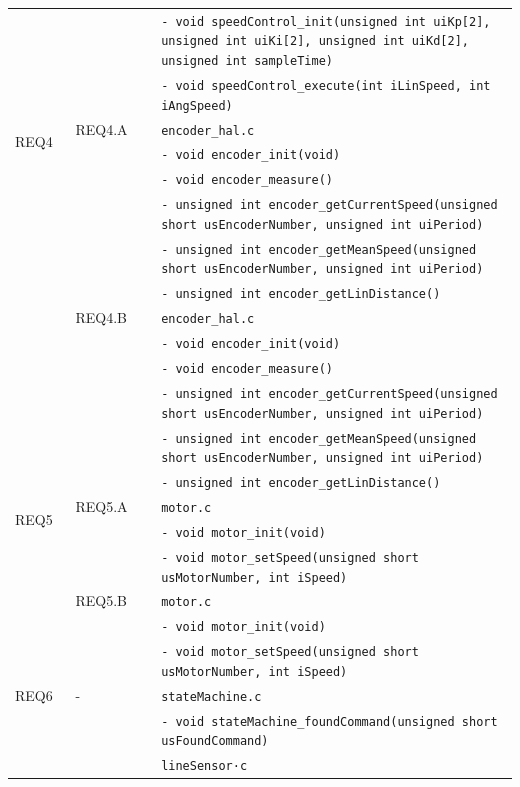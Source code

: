 \documentclass{article}
\begin{document}
\begin{longtable}{|p{0.125\linewidth}|p{0.17\linewidth}|p{0.75\linewidth}|}
        && \texttt{- void speedControl\_init(unsigned int uiKp[2], unsigned int uiKi[2], unsigned int uiKd[2], unsigned int sampleTime)}\\
        && \texttt{- void speedControl\_execute(int iLinSpeed, int iAngSpeed)}\\
        \hline
         \multirow{2}{*}{REQ4}
        & REQ4.A & \texttt{encoder\_hal.c}\\ 
        && \texttt{- void encoder\_init(void)}\\
        && \texttt{- void encoder\_measure()}\\
        && \texttt{- unsigned int encoder\_getCurrentSpeed(unsigned short usEncoderNumber, unsigned int uiPeriod)}\\
        && \texttt{- unsigned int encoder\_getMeanSpeed(unsigned short usEncoderNumber, unsigned int uiPeriod)}\\
        && \texttt{- unsigned int encoder\_getLinDistance()}\\
		\cline{2-3}
        & REQ4.B & \texttt{encoder\_hal.c}\\ 
        && \texttt{- void encoder\_init(void)}\\
        && \texttt{- void encoder\_measure()}\\
        && \texttt{- unsigned int encoder\_getCurrentSpeed(unsigned short usEncoderNumber, unsigned int uiPeriod)}\\
        && \texttt{- unsigned int encoder\_getMeanSpeed(unsigned short usEncoderNumber, unsigned int uiPeriod)}\\
        && \texttt{- unsigned int encoder\_getLinDistance()}\\
        \hline
         \multirow{2}{*}{REQ5}
        & REQ5.A & \texttt{motor.c}\\ 
        && \texttt{- void motor\_init(void)}\\
        && \texttt{- void motor\_setSpeed(unsigned short usMotorNumber, int iSpeed)}\\
		\cline{2-3}
        & REQ5.B & \texttt{motor.c}\\ 
        && \texttt{- void motor\_init(void)}\\
        && \texttt{- void motor\_setSpeed(unsigned short usMotorNumber, int iSpeed)}\\
		\hline
        REQ6 & - & \texttt{stateMachine.c}\\
         && \texttt{- void stateMachine\_foundCommand(unsigned short usFoundCommand)}\\
         && \texttt{lineSensor·c}\\

\end{longtable}
\end{document}
